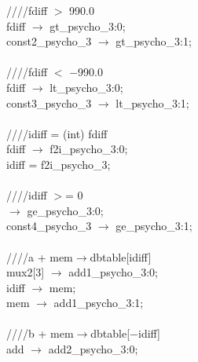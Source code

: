    \hspace*{2em}////fdiff $>$ 990.0 \\
   \hspace*{2em}fdiff $\rightarrow$ gt\_psycho\_3:0; \\
   \hspace*{2em}const2\_psycho\_3 $\rightarrow$ gt\_psycho\_3:1; \\
   \\
   \hspace*{2em}////fdiff $<$ $-$990.0 \\
   \hspace*{2em}fdiff $\rightarrow$ lt\_psycho\_3:0; \\
   \hspace*{2em}const3\_psycho\_3 $\rightarrow$ lt\_psycho\_3:1; \\
   \\
   \hspace*{2em}////idiff = (int) fdiff \\
   \hspace*{2em}fdiff $\rightarrow$ f2i\_psycho\_3:0; \\
   \hspace*{2em}idiff = f2i\_psycho\_3; \\
   \\
   \hspace*{2em}////idiff $>$= 0 \\
   \hspace*{2em} $\rightarrow$ ge\_psycho\_3:0; \\
   \hspace*{2em}const4\_psycho\_3 $\rightarrow$ ge\_psycho\_3:1; \\
   \\
   \hspace*{2em}////a + mem$\rightarrow$dbtable[idiff] \\
   \hspace*{2em}mux2[3] $\rightarrow$ add1\_psycho\_3:0; \\
   \hspace*{2em}idiff $\rightarrow$ mem; \\
   \hspace*{2em}mem $\rightarrow$ add1\_psycho\_3:1; \\
   \\
   \hspace*{2em}////b + mem$\rightarrow$dbtable[$-$idiff] \\
   \hspace*{2em}add $\rightarrow$ add2\_psycho\_3:0; \\
